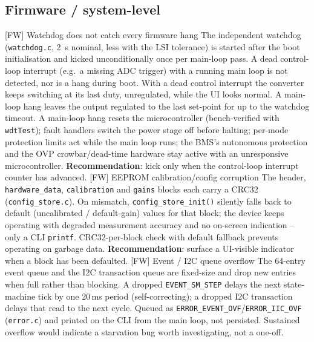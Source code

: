 \FloatBarrier

\subsection{Firmware / system-level}
\label{tab:fmea_mcu_hang}

    \begin{FMEATable}
    \FMEAItemCritical
        {[FW] Watchdog does not catch every firmware hang}
        {The independent watchdog (\texttt{watchdog.c}, \qty{2}{\second} nominal, less with the LSI tolerance) is started after the boot initialisation and kicked unconditionally once per main-loop pass. A dead control-loop interrupt (e.g.\ a missing \ac{ADC} trigger) with a running main loop is not detected, nor is a hang during boot.}
        {With a dead control interrupt the converter keeps switching at its last duty, unregulated, while the \ac{UI} looks normal. A main-loop hang leaves the output regulated to the last set-point for up to the watchdog timeout.}
        {A main-loop hang resets the microcontroller (bench-verified with \texttt{wdtTest}); fault handlers switch the power stage off before halting; per-mode protection limits act while the main loop runs; the \ac{BMS}'s autonomous protection and the \ac{OVP} crowbar/dead-time hardware stay active with an unresponsive microcontroller. \textbf{Recommendation}: kick only when the control-loop interrupt counter has advanced.}
    \FMEAItemModerate
        {[FW] EEPROM calibration/config corruption}
        {The header, \texttt{hardware\_data}, \texttt{calibration} and \texttt{gains} blocks each carry a CRC32 (\texttt{config\_store.c}).}
        {On mismatch, \texttt{config\_store\_init()} silently falls back to default (uncalibrated / default-gain) values for that block; the device keeps operating with degraded measurement accuracy and no on-screen indication -- only a \ac{CLI} \texttt{printf}.}
        {CRC32-per-block check with default fallback prevents operating on garbage data. \textbf{Recommendation}: surface a UI-visible indicator when a block has been defaulted.}
    \FMEAItemMinor
        {[FW] Event / \acs{I2C} queue overflow}
        {The 64-entry event queue and the \ac{I2C} transaction queue are fixed-size and drop new entries when full rather than blocking.}
        {A dropped \texttt{EVENT\_SM\_STEP} delays the next state-machine tick by one 20\,ms period (self-correcting); a dropped \ac{I2C} transaction delays that read to the next cycle.}
        {Queued as \texttt{ERROR\_EVENT\_OVF}/\texttt{ERROR\_IIC\_OVF} (\texttt{error.c}) and printed on the \ac{CLI} from the main loop, not persisted. Sustained overflow would indicate a starvation bug worth investigating, not a one-off.}
    \caption{FMEA -- Firmware / system-level} \\
    \end{FMEATable}
